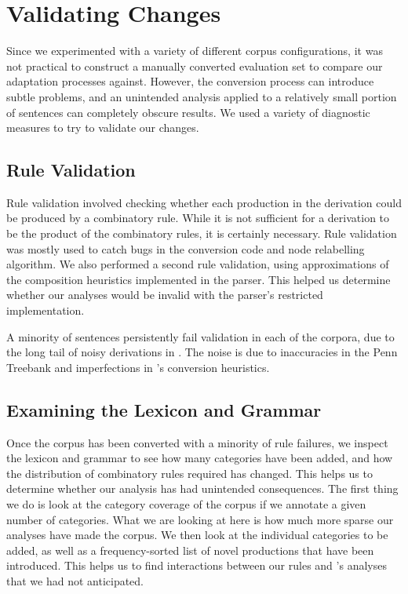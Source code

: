 \section{Validating Changes}

\label{sec:validation}

Since we experimented with a variety of different corpus configurations, it was
not practical to construct a manually converted evaluation set to compare our
adaptation processes against. However, the conversion process can introduce
subtle problems, and an unintended analysis applied to a relatively small
portion of sentences can completely obscure results. We used a variety of
diagnostic measures to try to validate our changes.

\subsection{Rule Validation}

Rule validation involved checking whether each production in the derivation
could be produced by a \ccg combinatory rule. While it is not sufficient for a
derivation to be the product of the \ccg combinatory rules, it is certainly
necessary. Rule validation was mostly used to catch bugs in the conversion code
and node relabelling algorithm. We also performed a second rule validation,
using approximations of the composition heuristics implemented in the \candc
parser. This helped us determine whether our analyses would be invalid with the
parser's restricted implementation.

A minority of sentences persistently fail validation in each of the corpora, due
to the long tail of noisy derivations in \ccgbank. The noise is due to
inaccuracies in the Penn Treebank and imperfections in \ccgbank's conversion
heuristics.

\subsection{Examining the Lexicon and Grammar}

Once the corpus has been converted with a minority of rule failures, we inspect
the lexicon and grammar to see how many categories have been added, and how the
distribution of combinatory rules required has changed. This helps us to
determine whether our analysis has had unintended consequences. The first thing
we do is look at the category coverage of the corpus if we annotate a given
number of categories. What we are looking at here is how much more sparse our
analyses have made the corpus. We then look at the individual categories to be
added, as well as a frequency-sorted list of novel productions that have been
introduced. This helps us to find interactions between our rules and \ccgbank's
analyses that we had not anticipated.

